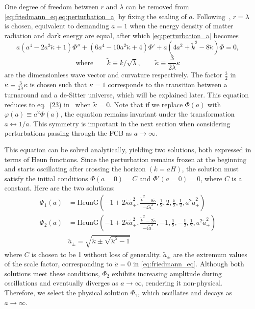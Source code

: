 \documentclass[%
 reprint,
 amsmath,amssymb,
 prl,
]{revtex4-2}
\begin{document}
One degree of freedom between \(r\) and \(\lambda\) can be removed from \cref{eq:friedmann_eq,eq:perturbation_a} by fixing the scaling of \(a\). Following~\cite{2022PhRvD.105h3514L}, \(r = \lambda\) is chosen, equivalent to demanding \(a=1\) when the energy density of matter radiation and dark energy are equal, after which \cref{eq:perturbation_a} becomes
\begin{equation}\label{eq:Phi_ODE}
    a(a^4 - 2a^2 \tilde\kappa + 1) \Phi'' + (6a^4- 10a^2 \tilde\kappa + 4 ) \Phi' + a(4a^2 + \tilde{k}^2-8\tilde\kappa) \Phi = 0, 
\end{equation}
\vspace{-2.5em}
\[ \text{where} \qquad
    \tilde{k} \equiv k/\sqrt{\lambda}, \qquad \tilde \kappa \equiv \frac{3}{2\lambda}\kappa\]
are the dimensionless wave vector and curvature respectively. The factor $\frac{3}{2}$ in $\tilde\kappa\equiv \frac{3}{2\lambda}\kappa$ is chosen such that $\tilde\kappa=1$ corresponds to the transition between a turnaround and a de-Sitter universe, which will be explained later. This equation reduces to eq.~(23) in~\citet{2022PhRvD.105h3514L} when \( \tilde\kappa = 0 \).
Note that if we replace \(\Phi(a)\) with \(\varphi(a) \equiv a^2 \Phi(a)\), the equation remains invariant under the transformation \({a\leftrightarrow1/a}\). This symmetry is important in the next section when considering perturbations passing through the FCB as \(a\rightarrow \infty\).

This equation can be solved analytically, yielding two solutions, both expressed in terms of Heun functions. Since the perturbation remains frozen at the beginning and starts oscillating after crossing the horizon \((k = aH)\), the solution must satisfy the initial conditions \(\Phi(a = 0) = C\) and \(\Phi'(a = 0) = 0\), where \(C\) is a constant. Here are the two solutions:
\begin{equation}
\begin{aligned}\label{eq:Heun}
    \Phi_1(a) &= \text{HeunG} \left( -1+2\tilde\kappa \tilde a_+^2,\frac{\tilde k^2-8\tilde\kappa}{-4 \tilde a_-^2},\frac{1}{2},2, \frac{5}{2},\frac{1}{2},a^2\tilde a_+^2\right)\\
    \Phi_2(a) &= \text{HeunG}\left(-1+2\tilde\kappa \tilde a_+^2,\frac{\tilde k^2-2\tilde\kappa}{-4\tilde a_-^2},-1,\frac{1}{2},-\frac{1}{2},\frac{1}{2},a^2\tilde a_+^2\right)\\
    &\tilde a_{\pm}=\sqrt{\tilde\kappa\pm\sqrt{\tilde\kappa^2-1}}
\end{aligned}
\end{equation}
where \(C\) is chosen to be 1 without loss of generality. \(\tilde{a}_{\pm}\) are the extremum values of the scale factor, corresponding to \(\dot{a}=0\) in \cref{eq:friedmann_eq}. Although both solutions meet these conditions, $\Phi_2$ exhibits increasing amplitude during oscillations and eventually diverges as \(a \to \infty\), rendering it non-physical. Therefore, we select the physical solution $\Phi_1$, which oscillates and decays as \(a \to \infty\).
\end{document}
